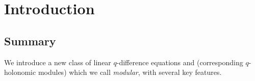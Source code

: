 \documentclass[12pt,reqno]{amsart}
\theoremstyle{definition}
\begin{document}
\maketitle

{\footnotesize
\tableofcontents
}


\section{Introduction}
\label{sec.intro}

\subsection{Summary}
We introduce a new class of linear $q$-difference equations and (corresponding
$q$-holonomic modules) which we call \emph{modular}, with several key features.
\end{document}
